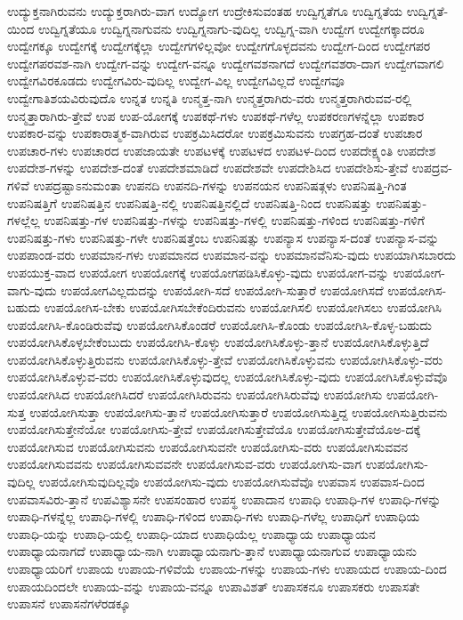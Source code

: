 {ಉದ್ಯುಕ್ತನಾಗಿರುವನು
ಉದ್ಯುಕ್ತರಾಗಿರು-ವಾಗ
ಉದ್ಯೋಗ
ಉದ್ರೇಕಿಸುವಂತಹ
ಉದ್ವಿಗ್ನತೆಗೂ
ಉದ್ವಿಗ್ನತೆಯ
ಉದ್ವಿಗ್ನತೆ-ಯಿಂದ
ಉದ್ವಿಗ್ನತೆಯೂ
ಉದ್ವಿಗ್ನನಾಗುವನು
ಉದ್ವಿಗ್ನನಾಗು-ವುದಿಲ್ಲ
ಉದ್ವಿಗ್ನ-ವಾಗಿ
ಉದ್ವೇಗ
ಉದ್ವೇಗಕ್ಕಾದರೂ
ಉದ್ವೇಗಕ್ಕೂ
ಉದ್ವೇಗಕ್ಕೆ
ಉದ್ವೇಗಕ್ಕೆಲ್ಲಾ
ಉದ್ವೇಗಗಳಿಲ್ಲವೋ
ಉದ್ವೇಗಗೊಳ್ಳದವನು
ಉದ್ವೇಗ-ದಿಂದ
ಉದ್ವೇಗಪರ
ಉದ್ವೇಗಪರವಶ-ನಾಗಿ
ಉದ್ವೇಗ-ವನ್ನು
ಉದ್ವೇಗ-ವನ್ನೂ
ಉದ್ವೇಗವಶನಾಗದೆ
ಉದ್ವೇಗವಶರಾ-ದಾಗ
ಉದ್ವೇಗವಾಗಲಿ
ಉದ್ವೇಗವಿರಕೂಡದು
ಉದ್ವೇಗವಿರು-ವುದಿಲ್ಲ
ಉದ್ವೇಗ-ವಿಲ್ಲ
ಉದ್ವೇಗವಿಲ್ಲದೆ
ಉದ್ವೇಗವೂ
ಉದ್ವೇಗಾತಿಶಯವಿರುವುದೊ
ಉನ್ನತ
ಉನ್ನತಿ
ಉನ್ಮತ್ತ-ನಾಗಿ
ಉನ್ಮತ್ತರಾಗಿರು-ವರು
ಉನ್ಮತ್ತರಾಗಿರುವವ-ರಲ್ಲಿ
ಉನ್ಮತ್ತಾರಾಗಿರು-ತ್ತೇವೆ
ಉಪ
ಉಪ-ಯೋಗಕ್ಕೆ
ಉಪಕಥೆ-ಗಳು
ಉಪಕಥೆ-ಗಳೆಲ್ಲ
ಉಪಕರಣಗಳನ್ನೆಲ್ಲಾ
ಉಪಕಾರ
ಉಪಕಾರ-ವನ್ನು
ಉಪಕಾರಾತ್ಮಕ-ವಾಗಿರುವ
ಉಪಕ್ರಮಿಸಿದರೋ
ಉಪಕ್ರಮಿಸುವನು
ಉಪಗ್ರಹ-ದಂತೆ
ಉಪಚಾರ
ಉಪಚಾರ-ಗಳು
ಉಪಚಾರದ
ಉಪಜಾಯತೇ
ಉಪಟಳಕ್ಕೆ
ಉಪಟಳದ
ಉಪಟಳ-ದಿಂದ
ಉಪದೇಕ್ಷ್ಯಂತಿ
ಉಪದೇಶ
ಉಪದೇಶ-ಗಳನ್ನು
ಉಪದೇಶ-ದಂತೆ
ಉಪದೇಶಮಾಡಿದೆ
ಉಪದೇಶವೇ
ಉಪದೇಶಿಸಿದ
ಉಪದೇಶಿಸು-ತ್ತೇವೆ
ಉಪದ್ರವ-ಗಳಿವೆ
ಉಪದ್ರಷ್ಟಾಽನುಮಂತಾ
ಉಪನದಿ
ಉಪನದಿ-ಗಳನ್ನು
ಉಪನಯನ
ಉಪನಿಷತ್ಗಳು
ಉಪನಿಷತ್ತಿ-ಗಿಂತ
ಉಪನಿಷತ್ತಿಗೆ
ಉಪನಿಷತ್ತಿನ
ಉಪನಿಷತ್ತಿ-ನಲ್ಲಿ
ಉಪನಿಷತ್ತಿನಲ್ಲಿದೆ
ಉಪನಿಷತ್ತಿ-ನಿಂದ
ಉಪನಿಷತ್ತು
ಉಪನಿಷತ್ತು-ಗಳಲ್ಲೆಲ್ಲ
ಉಪನಿಷತ್ತು-ಗಳ
ಉಪನಿಷತ್ತು-ಗಳನ್ನು
ಉಪನಿಷತ್ತು-ಗಳಲ್ಲಿ
ಉಪನಿಷತ್ತು-ಗಳಿಂದ
ಉಪನಿಷತ್ತು-ಗಳಿಗೆ
ಉಪನಿಷತ್ತು-ಗಳು
ಉಪನಿಷತ್ತು-ಗಳೇ
ಉಪನಿಷತ್ತೆಂಬ
ಉಪನಿಷತ್ಸು
ಉಪನ್ಯಾಸ
ಉಪನ್ಯಾಸ-ದಂತೆ
ಉಪನ್ಯಾಸ-ವನ್ನು
ಉಪಪಾಂಡ-ವರು
ಉಪಮಾನ-ಗಳು
ಉಪಮಾನದ
ಉಪಮಾನ-ವನ್ನು
ಉಪಮಾನವೆನಿಸು-ವುದು
ಉಪಯಾಗಿಸಬಾರದು
ಉಪಯುಕ್ತ-ವಾದ
ಉಪಯೋಗ
ಉಪಯೋಗಕ್ಕೆ
ಉಪಯೋಗಪಡಿಸಿಕೊಳ್ಳು-ವುದು
ಉಪಯೋಗ-ವನ್ನು
ಉಪಯೋಗ-ವಾಗು-ವುದು
ಉಪಯೋಗವಿಲ್ಲದುದನ್ನು
ಉಪಯೋಗಿ-ಸದೆ
ಉಪಯೋಗಿ-ಸುತ್ತಾರೆ
ಉಪಯೋಗಿಸದೆ
ಉಪಯೋಗಿಸ-ಬಹುದು
ಉಪಯೋಗಿಸ-ಬೇಕು
ಉಪಯೋಗಿಸಬೇಕೆಂದಿರುವನು
ಉಪಯೋಗಿಸಲಿ
ಉಪಯೋಗಿಸಲು
ಉಪಯೋಗಿಸಿ
ಉಪಯೋಗಿಸಿ-ಕೊಂಡಿರುವೆವು
ಉಪಯೋಗಿಸಿಕೊಂಡರೆ
ಉಪಯೋಗಿಸಿ-ಕೊಂಡು
ಉಪಯೋಗಿಸಿ-ಕೊಳ್ಳ-ಬಹುದು
ಉಪಯೋಗಿಸಿಕೊಳ್ಳಬೇಕೆಂಬುದು
ಉಪಯೋಗಿಸಿ-ಕೊಳ್ಳು
ಉಪಯೋಗಿಸಿಕೊಳ್ಳು-ತ್ತಾನೆ
ಉಪಯೋಗಿಸಿಕೊಳ್ಳುತ್ತಿದೆ
ಉಪಯೋಗಿಸಿಕೊಳ್ಳುತ್ತಿರುವನು
ಉಪಯೋಗಿಸಿಕೊಳ್ಳು-ತ್ತೇವೆ
ಉಪಯೋಗಿಸಿಕೊಳ್ಳುವನು
ಉಪಯೋಗಿಸಿಕೊಳ್ಳು-ವರು
ಉಪಯೋಗಿಸಿಕೊಳ್ಳುವ-ವರು
ಉಪಯೋಗಿಸಿಕೊಳ್ಳುವುದಲ್ಲ
ಉಪಯೋಗಿಸಿಕೊಳ್ಳು-ವುದು
ಉಪಯೋಗಿಸಿಕೊಳ್ಳುವೆವೊ
ಉಪಯೋಗಿಸಿದ
ಉಪಯೋಗಿಸಿದರೆ
ಉಪಯೋಗಿಸಿರುವನು
ಉಪಯೋಗಿಸಿರುವೆವು
ಉಪಯೋಗಿಸು
ಉಪಯೋಗಿ-ಸುತ್ತ
ಉಪಯೋಗಿಸುತ್ತಾ
ಉಪಯೋಗಿಸು-ತ್ತಾನೆ
ಉಪಯೋಗಿಸುತ್ತಾರೆ
ಉಪಯೋಗಿಸುತ್ತಿದ್ದ
ಉಪಯೋಗಿಸುತ್ತಿರುವನು
ಉಪಯೋಗಿಸುತ್ತೇನೆಯೋ
ಉಪಯೋಗಿಸು-ತ್ತೇವೆ
ಉಪಯೋಗಿಸುತ್ತೇವೆಯೊ
ಉಪಯೋಗಿಸುತ್ತೇವೆಯೊಅ-ದಕ್ಕೆ
ಉಪಯೋಗಿಸುವ
ಉಪಯೋಗಿಸುವನು
ಉಪಯೋಗಿಸುವನೇ
ಉಪಯೋಗಿಸು-ವರು
ಉಪಯೋಗಿಸುವವನ
ಉಪಯೋಗಿಸುವವನು
ಉಪಯೋಗಿಸುವವನೇ
ಉಪಯೋಗಿಸುವ-ವರು
ಉಪಯೋಗಿಸು-ವಾಗ
ಉಪಯೋಗಿಸು-ವುದಿಲ್ಲ
ಉಪಯೋಗಿಸುವುದಿಲ್ಲವೊ
ಉಪಯೋಗಿಸು-ವುದು
ಉಪಯೋಗಿಸುವೆವೊ
ಉಪವಾಸ
ಉಪವಾಸ-ದಿಂದ
ಉಪವಾಸವಿರು-ತ್ತಾನೆ
ಉಪವಿಶ್ಯಾಸನೇ
ಉಪಸಂಹಾರ
ಉಪಸ್ಥ
ಉಪಾದಾನ
ಉಪಾಧಿ
ಉಪಾಧಿ-ಗಳ
ಉಪಾಧಿ-ಗಳನ್ನು
ಉಪಾಧಿ-ಗಳನ್ನೆಲ್ಲ
ಉಪಾಧಿ-ಗಳಲ್ಲಿ
ಉಪಾಧಿ-ಗಳಿಂದ
ಉಪಾಧಿ-ಗಳು
ಉಪಾಧಿ-ಗಳೆಲ್ಲ
ಉಪಾಧಿಗೆ
ಉಪಾಧಿಯ
ಉಪಾಧಿ-ಯನ್ನು
ಉಪಾಧಿ-ಯಲ್ಲಿ
ಉಪಾಧಿ-ಯಾದ
ಉಪಾಧಿಯೆಲ್ಲ
ಉಪಾಧ್ಯಾಯ
ಉಪಾಧ್ಯಾಯನ
ಉಪಾಧ್ಯಾಯನಾಗದೆ
ಉಪಾಧ್ಯಾಯ-ನಾಗಿ
ಉಪಾಧ್ಯಾಯನಾಗು-ತ್ತಾನೆ
ಉಪಾಧ್ಯಾಯನಾಗುವ
ಉಪಾಧ್ಯಾಯನು
ಉಪಾಧ್ಯಾಯರಿಗೆ
ಉಪಾಯ
ಉಪಾಯ-ಗಳಿವೆಯೆ
ಉಪಾಯ-ಗಳನ್ನು
ಉಪಾಯ-ಗಳು
ಉಪಾಯದ
ಉಪಾಯ-ದಿಂದ
ಉಪಾಯದಿಂದಲೇ
ಉಪಾಯ-ವನ್ನು
ಉಪಾಯ-ವನ್ನೂ
ಉಪಾವಿಶತ್
ಉಪಾಸಕನೂ
ಉಪಾಸಕರು
ಉಪಾಸತೇ
ಉಪಾಸನೆ
ಉಪಾಸನೆಗಳೆರಡಕ್ಕೂ
}
